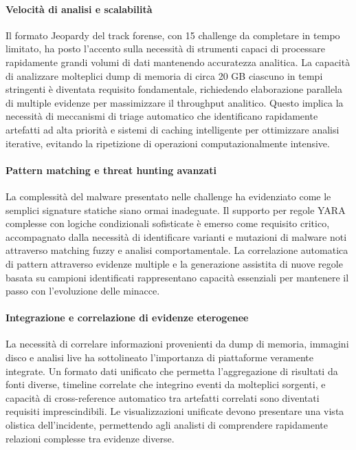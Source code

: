 \paragraph{Velocità di analisi e scalabilità}
Il formato Jeopardy del track forense, con 15 challenge da completare in tempo limitato, ha posto l'accento sulla necessità di strumenti capaci di processare rapidamente grandi volumi di dati mantenendo accuratezza analitica. La capacità di analizzare molteplici dump di memoria di circa 20 GB ciascuno in tempi stringenti è diventata requisito fondamentale, richiedendo elaborazione parallela di multiple evidenze per massimizzare il throughput analitico. Questo implica la necessità di meccanismi di triage automatico che identificano rapidamente artefatti ad alta priorità e sistemi di caching intelligente per ottimizzare analisi iterative, evitando la ripetizione di operazioni computazionalmente intensive.

\paragraph{Pattern matching e threat hunting avanzati}
La complessità del malware presentato nelle challenge ha evidenziato come le semplici signature statiche siano ormai inadeguate. Il supporto per regole YARA complesse con logiche condizionali sofisticate è emerso come requisito critico, accompagnato dalla necessità di identificare varianti e mutazioni di malware noti attraverso matching fuzzy e analisi comportamentale. La correlazione automatica di pattern attraverso evidenze multiple e la generazione assistita di nuove regole basata su campioni identificati rappresentano capacità essenziali per mantenere il passo con l'evoluzione delle minacce.

\paragraph{Integrazione e correlazione di evidenze eterogenee}
La necessità di correlare informazioni provenienti da dump di memoria, immagini disco e analisi live ha sottolineato l'importanza di piattaforme veramente integrate. Un formato dati unificato che permetta l'aggregazione di risultati da fonti diverse, timeline correlate che integrino eventi da molteplici sorgenti, e capacità di cross-reference automatico tra artefatti correlati sono diventati requisiti imprescindibili. Le visualizzazioni unificate devono presentare una vista olistica dell'incidente, permettendo agli analisti di comprendere rapidamente relazioni complesse tra evidenze diverse.


